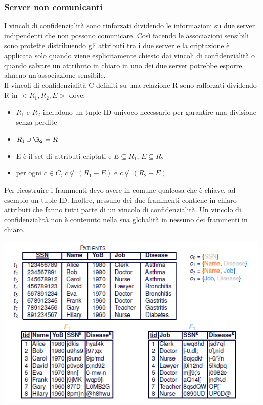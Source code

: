 \subsubsection{Server non comunicanti}
I vincoli di confidenzialità sono rinforzati dividendo le informazioni su due server indipendenti che non possono comunicare. Così facendo le associazioni sensibili sono protette distribuendo gli attributi tra i due server e la criptazione è applicata solo quando viene esplicitamente chiesto dai vincoli di confidenzialità o quando salvare un attributo in chiaro in uno dei due server potrebbe esporre almeno un'associazione sensibile.\\
Il vincoli di confidenzialità C definiti su una relazione R sono rafforzati dividendo R in \(<R_1, R_2, E>\) dove:
\begin{itemize}
    \item \(R_1\) e \(R_2\) includono un tuple ID univoco necessario per garantire una divisione senza perdite
    \item \(R_1 \cup \R_2 = R\)
    \item E è il set di attributi criptati e \( E \subseteq R_1\), \( E \subseteq R_2\)
    \item per ogni \(c \in C\), \(c \nsubseteq (R_1 - E)\) e \(c \nsubseteq (R_2 - E)\) 
\end{itemize}
Per ricostruire i frammenti devo avere in comune qualcosa che è chiave, ad esempio un tuple ID. Inoltre, nessuno dei due frammenti contiene in chiaro attributi che fanno tutti parte di un vincolo di confidenzialità. Un vincolo di confidenzialità non è contenuto nella sua globalità in nessuno dei frammenti in chiaro.
\begin{center}
    \includegraphics[scale=0.7]{img/noncommserv.png}
\end{center}
